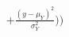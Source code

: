 \documentclass[preview]{standalone}
\begin{document}
\begin{align*}
+ \frac{(y - \mu_Y)^2}{\sigma_Y^2} \big) \big)
\end{align*}
\end{document}
